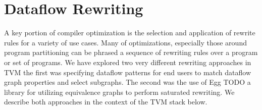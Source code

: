 \section{Dataflow Rewriting}

A key portion of compiler optimization is
  the selection and application of rewrite rules for a variety
  of use cases.
Many of optimizations, especially those around program partitioning can
  be phrased a sequence of rewriting rules over a program or set of
  programs.
We have explored two very different rewriting approaches in TVM
  the first was specifying dataflow patterns for end users to
  match dataflow graph properties and select subgraphs.
The second was the use of Egg TODO a library
  for utilizing equivalence graphs to perform saturated rewriting.
We describe both approaches in the context of the TVM stack
  below.
